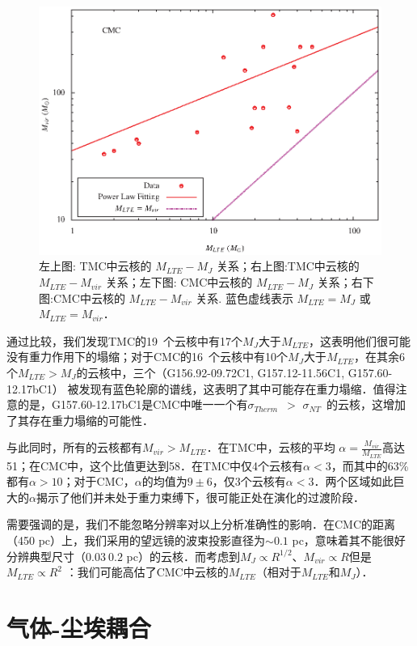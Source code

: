 \documentclass[UTF8, nocolorlinks]{pkuthss}
\newcommand{\sigmath}{$\sigma _{Therm}$\ }
\newcommand{\sigmant}{$\sigma _{NT}$\ }
\newcommand{\numcoretmc}{19\ }
\newcommand{\numcorecmc}{16\ }
\begin{document}
\begin{figure}[htbp]
			\includegraphics[totalheight=50mm]{img_plot/M_vir_cmc.eps}
			\caption{左上图: TMC中云核的 $M_{LTE}-M_{J}$ 关系；右上图:TMC中云核的 $M_{LTE}-M_{vir}$ 关系；左下图: CMC中云核的 $M_{LTE}-M_{J}$ 关系；右下图:CMC中云核的 $M_{LTE}-M_{vir}$ 关系.  蓝色虚线表示 $M_{LTE}=M_{J}$ 或 $M_{LTE}=M_{vir}$．\label{Fig.Mass}}
		\end{figure}

		通过比较，我们发现TMC的\numcoretmc 个云核中有17个$M_J$大于$M_{LTE}$，这表明他们很可能没有重力作用下的塌缩；对于CMC的\numcorecmc 个云核中有10个$M_J$大于$M_{LTE}$，在其余6个$M_{LTE}>M_J$的云核中，三个（G156.92-09.72C1, G157.12-11.56C1, G157.60-12.17bC1） 被发现有蓝色轮廓的谱线，这表明了其中可能存在重力塌缩．值得注意的是，G157.60-12.17bC1是CMC中唯一一个有\sigmath $>$ \sigmant 的云核，这增加了其存在重力塌缩的可能性．

		与此同时，所有的云核都有$M_{vir}>M_{LTE}$．在TMC中，云核的平均 $\alpha=\frac{M_{vir}}{M_{LTE}}$高达51；在CMC中，这个比值更达到58．在TMC中仅4个云核有$\alpha<3$，而其中的63\%都有$\alpha>10$；对于CMC，$\alpha$的均值为$9\pm6$，仅3个云核有$\alpha<3$．两个区域如此巨大的$\alpha$揭示了他们并未处于重力束缚下，很可能正处在演化的过渡阶段．

		需要强调的是，我们不能忽略分辨率对以上分析准确性的影响．在CMC的距离（450 pc）上，我们采用的望远镜的波束投影直径为$\sim 0.1$ pc，意味着其不能很好分辨典型尺寸（$0.03~0.2$ pc）\supercite{2007ARA&A..45..339B}的云核．而考虑到$M_{J}\propto R^{1/2}$、$M_{vir}\propto R$但是 $M_{LTE}\propto R^2$ ：我们可能高估了CMC中云核的$M_{LTE}$（相对于$M_{LTE}$和$M_{J}$）．

	\section{气体-尘埃耦合}\label{Sec.GasDust}
\end{document}
